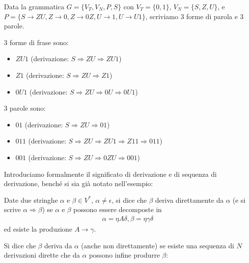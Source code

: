 \documentclass{article}
\begin{document}
\begin{example}
\label{ex:esempio3.1} %
Data la grammatica \( G = \{V_T, V_N, P, S\} \) con \( V_T = \{0, 1\} \), \( V_N = \{S, Z, U\} \), e \( P = \{S \rightarrow ZU, Z \rightarrow 0, Z \rightarrow 0Z, U \rightarrow 1, U \rightarrow U1\} \), scriviamo 3 forme di parola e 3 parole.

3 forme di frase sono:
\begin{itemize}
    \item \( ZU1 \) (derivazione: \( S \Rightarrow ZU \Rightarrow ZU1 \))
    \item \( Z1 \) (derivazione: \( S \Rightarrow ZU \Rightarrow Z1 \))
    \item \( 0U1 \) (derivazione: \( S \Rightarrow ZU \Rightarrow 0U \Rightarrow 0U1 \))
\end{itemize}

3 parole sono:
\begin{itemize}
    \item \( 01 \) (derivazione: \( S \Rightarrow ZU \Rightarrow 01 \))
    \item \( 011 \) (derivazione: \( S \Rightarrow ZU \Rightarrow ZU1 \Rightarrow Z11 \Rightarrow 011 \))
    \item \( 001 \) (derivazione: \( S \Rightarrow ZU \Rightarrow 0ZU \Rightarrow 001 \))
\end{itemize}
\end{example}

\noindent%
Introduciamo formalmente il significato di derivazione e di sequenza di derivazione, benché  si sia già notato nell'esempio:
\begin{definition}
Date due stringhe \( \alpha \) e \( \beta \in V^* \), \( \alpha \neq \epsilon \), si dice che \( \beta \) deriva direttamente da \( \alpha \) (e si scrive \( \alpha \Rightarrow \beta \)) se \( \alpha \) e \( \beta \) possono essere decomposte in
\[
\begin{array}{c}
    \alpha = \eta A \delta, \beta = \eta \gamma \delta
\end{array}
\]
ed esiste la produzione \( A \rightarrow \gamma \).
\end{definition}

Si dice che \( \beta \) deriva da \( \alpha \) (anche non direttamente) se esiste una sequenza di \( N \) derivazioni dirette che da \( \alpha \) possono infine produrre \( \beta \):
\end{document}
